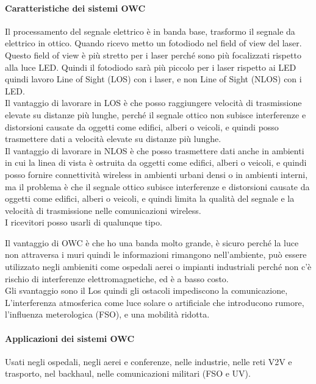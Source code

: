 \paragraph{Caratteristiche dei sistemi OWC}

Il processamento del segnale elettrico è in banda base, trasformo il segnale da elettrico in ottico. Quando ricevo metto un fotodiodo nel field of view del laser. Questo field of view è più stretto per i laser perché sono più focalizzati rispetto alla luce LED. Quindi il fotodiodo sarà più piccolo per i laser rispetto ai LED quindi lavoro Line of Sight (LOS) con i laser, e non Line of Sight (NLOS) con i LED.\\
Il vantaggio di lavorare in LOS è che posso raggiungere velocità di trasmissione elevate su distanze più lunghe, perché il segnale ottico non subisce interferenze e distorsioni causate da oggetti come edifici, alberi o veicoli, e quindi posso trasmettere dati a velocità elevate su distanze più lunghe.\\
Il vantaggio di lavorare in NLOS è che posso trasmettere dati anche in ambienti in cui la linea di vista è ostruita da oggetti come edifici, alberi o veicoli, e quindi posso fornire connettività wireless in ambienti urbani densi o in ambienti interni, ma il problema è che il segnale ottico subisce interferenze e distorsioni causate da oggetti come edifici, alberi o veicoli, e quindi limita la qualità del segnale e la velocità di trasmissione nelle comunicazioni wireless.\\

I ricevitori posso usarli di qualunque tipo. 

Il vantaggio di OWC è che ho una banda molto grande, è sicuro perché la luce non attraversa i muri quindi le informazioni rimangono nell'ambiente, può essere utilizzato negli ambieniti come ospedali aerei o impianti industriali perché non c'è rischio di interferenze elettromagnetiche, ed è a basso costo.\\
Gli svantaggio sono il Los quindi gli ostacoli impediscono la comunicazione, L'interferenza atmosferica come luce solare o artificiale che introducono rumore, l'influenza meterologica (FSO), e una mobilità ridotta.\\

\paragraph{Applicazioni dei sistemi OWC}
Usati negli ospedali, negli aerei e conferenze, nelle industrie, nelle reti V2V e trasporto, nel backhaul, nelle comunicazioni militari (FSO e UV).\\

